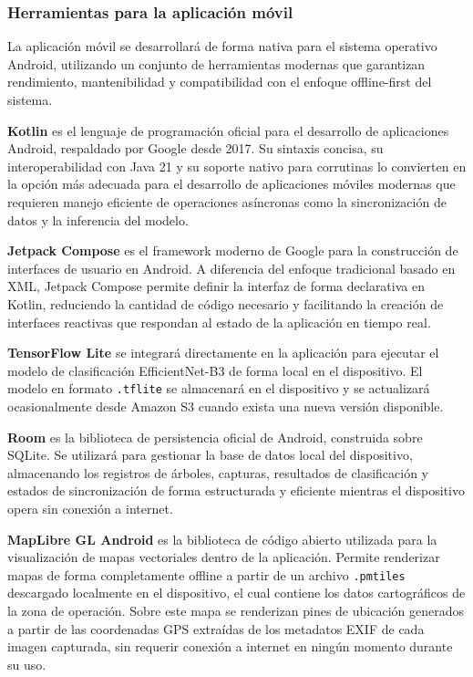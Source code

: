 \newpage
\subsubsection{Herramientas para la aplicación móvil}

La aplicación móvil se desarrollará de forma nativa para el sistema
operativo Android, utilizando un conjunto de herramientas modernas
que garantizan rendimiento, mantenibilidad y compatibilidad con el
enfoque offline-first del sistema.

\textbf{Kotlin} es el lenguaje de programación oficial para el
desarrollo de aplicaciones Android, respaldado por Google desde 2017.
Su sintaxis concisa, su interoperabilidad con Java 21 y su soporte nativo
para corrutinas lo convierten en la opción más adecuada para el
desarrollo de aplicaciones móviles modernas que requieren manejo
eficiente de operaciones asíncronas como la sincronización de datos
y la inferencia del modelo.

\textbf{Jetpack Compose} es el framework moderno de Google para la
construcción de interfaces de usuario en Android. A diferencia del
enfoque tradicional basado en XML, Jetpack Compose permite definir
la interfaz de forma declarativa en Kotlin, reduciendo la cantidad
de código necesario y facilitando la creación de interfaces reactivas
que respondan al estado de la aplicación en tiempo real.

\textbf{TensorFlow Lite} se integrará directamente en la aplicación
para ejecutar el modelo de clasificación EfficientNet-B3 de forma
local en el dispositivo. El modelo en formato \texttt{.tflite} se
almacenará en el dispositivo y se actualizará ocasionalmente desde
Amazon S3 cuando exista una nueva versión disponible.

\textbf{Room} es la biblioteca de persistencia oficial de Android,
construida sobre SQLite. Se utilizará para gestionar la base de datos
local del dispositivo, almacenando los registros de árboles, capturas,
resultados de clasificación y estados de sincronización de forma
estructurada y eficiente mientras el dispositivo opera sin conexión
a internet.

\textbf{MapLibre GL Android} es la biblioteca de código abierto utilizada
para la visualización de mapas vectoriales dentro de la aplicación.
Permite renderizar mapas de forma completamente offline a partir de
un archivo \texttt{.pmtiles} descargado localmente en el dispositivo,
el cual contiene los datos cartográficos de la zona de operación.
Sobre este mapa se renderizan pines de ubicación generados a partir
de las coordenadas GPS extraídas de los metadatos EXIF de cada imagen
capturada, sin requerir conexión a internet en ningún momento durante
su uso.

